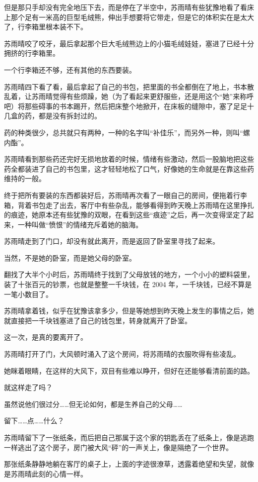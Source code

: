 但是那只手却没有完全地压下去，而是停在了半空中，苏雨晴有些犹豫地看了看床上那个足有一米高的巨型毛绒熊，伸出手想要将它带走，但是它的体积实在是太大了，行李箱里根本装不下。

苏雨晴咬了咬牙，最后拿起那个巨大毛绒熊边上的小猫毛绒娃娃，塞进了已经十分拥挤的行李箱里。

一个行李箱还不够，还有其他的东西要装。

苏雨晴四下看了看，最后拿起了自己的书包，把里面的书全都倒在了地上，书本散乱着，让苏雨晴觉得有些烦躁，她（为了看起来更舒服些，还是用这个“她”来称呼吧）将那些碍事的书本踢开，然后把床整个地掀开，在床板的缝隙中，塞了足足十几盒的药，都是没有拆封过的。

药的种类很少，总共就只有两种，一种的名字叫“补佳乐”，而另外一种，则叫“螺内酯”。

苏雨晴看到那些药还完好无损地放着的时候，情绪有些激动，然后一股脑地把这些药全都装进了自己的书包里，这才轻轻地松了口气，好像她的生命就是在靠这些药维持的一般。

终于把所有要装的东西都装好后，苏雨晴再次看了一眼自己的房间，便拖着行李箱，背着书包走了出去，客厅中有些杂乱，能够看得到昨天晚上苏雨晴在这里挣扎的痕迹，她原本还有些犹豫的双眼，在看到这些“痕迹”之后，再一次变得坚定了起来，一种叫做“愤恨”的情绪充斥着她的脑海。

苏雨晴走到了门口，却没有就此离开，而是返回了卧室里寻找了起来。

当然，不是她的卧室，而是她父母的卧室。

翻找了大半个小时后，苏雨晴终于找到了父母放钱的地方，一个小小的塑料袋里，装了十张百元的钞票，也就是整整一千块钱，在 2004 年，一千块钱，已经不算是一笔小数目了。

苏雨晴拿着钱，似乎在犹豫该拿多少，但是等她想到昨天晚上发生的事情之后，她就直接把一千块钱塞进了自己的钱包里，转身就离开了卧室。

这一次，是真的要离开了。

苏雨晴打开了门，大风顿时涌入了这个房间，将苏雨晴的衣服吹得有些凌乱。

她眯着眼睛，在这样的大风下，双目有些难以睁开，但好在还能够看清前面的路。

就这样走了吗？

虽然说他们很过分……但无论如何，都是生养自己的父母……

留下……点……什么？

苏雨晴留下了一张纸条，而后把自己那属于这个家的钥匙丢在了纸条上，像是逃跑一样逃出了这个房子，房门被大风“砰”的一声关上，像是隔绝了一个世界。

那张纸条静静地躺在客厅的桌子上，上面的字迹很潦草，透露着绝望和失望，就像是苏雨晴此刻的心情一样。

